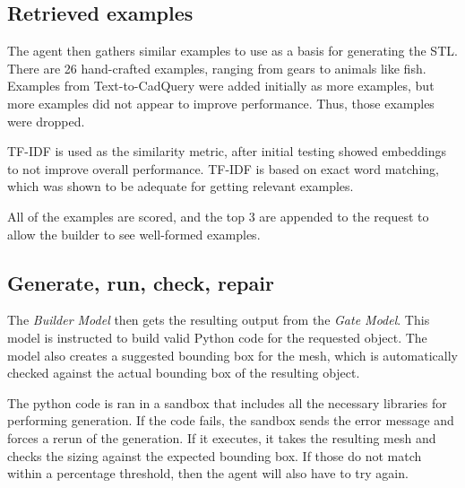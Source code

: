 \subsection{Retrieved examples}

The agent then gathers similar examples to use as a basis for generating the STL.
There are 26 hand-crafted examples, ranging from gears to animals like fish.
Examples from Text-to-CadQuery were added initially as more examples, but more examples did not appear to improve performance.
Thus, those examples were dropped.

TF-IDF is used as the similarity metric, after initial testing showed embeddings to not improve overall performance.
TF-IDF is based on exact word matching, which was shown to be adequate for getting relevant examples.

All of the examples are scored, and the top 3 are appended to the request to allow the builder to see well-formed examples.

\subsection{Generate, run, check, repair}

The \textit{Builder Model} then gets the resulting output from the \textit{Gate Model}.
This model is instructed to build valid Python code for the requested object.
The model also creates a suggested bounding box for the mesh, which is automatically checked against the actual bounding box of the resulting object.

The python code is ran in a sandbox that includes all the necessary libraries for performing generation.
If the code fails, the sandbox sends the error message and forces a rerun of the generation.
If it executes, it takes the resulting mesh and checks the sizing against the expected bounding box.
If those do not match within a percentage threshold, then the agent will also have to try again.

